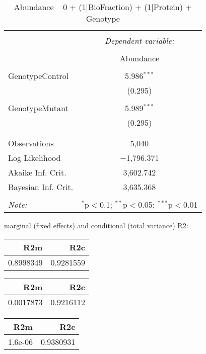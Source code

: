 \documentclass[11pt]{report}
\begin{document}
\begin{table}[!htbp] \centering 
  \caption{Abundance ~ 0 + (1|BioFraction) + (1|Protein) + Genotype} 
  \label{} 
\begin{tabular}{@{\extracolsep{5pt}}lc} 
\\[-1.8ex]\hline 
\hline \\[-1.8ex] 
 & \multicolumn{1}{c}{\textit{Dependent variable:}} \\ 
\cline{2-2} 
\\[-1.8ex] & Abundance \\ 
\hline \\[-1.8ex] 
 GenotypeControl & 5.986$^{***}$ \\ 
  & (0.295) \\ 
  & \\ 
 GenotypeMutant & 5.989$^{***}$ \\ 
  & (0.295) \\ 
  & \\ 
\hline \\[-1.8ex] 
Observations & 5,040 \\ 
Log Likelihood & $-$1,796.371 \\ 
Akaike Inf. Crit. & 3,602.742 \\ 
Bayesian Inf. Crit. & 3,635.368 \\ 
\hline 
\hline \\[-1.8ex] 
\textit{Note:}  & \multicolumn{1}{r}{$^{*}$p$<$0.1; $^{**}$p$<$0.05; $^{***}$p$<$0.01} \\ 
\end{tabular} 
\end{table} 
marginal (fixed effects) and conditional (total variance) R2:

\begin{tabular}{r|r}
\hline
R2m & R2c\\
\hline
0.8998349 & 0.9281559\\
\hline
\end{tabular}

\begin{tabular}{r|r}
\hline
R2m & R2c\\
\hline
0.0017873 & 0.9216112\\
\hline
\end{tabular}

\begin{tabular}{r|r}
\hline
R2m & R2c\\
\hline
1.6e-06 & 0.9380931\\
\hline
\end{tabular}
\end{document}
